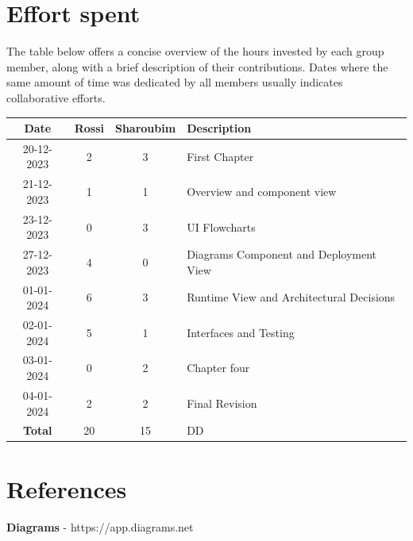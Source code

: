 \documentclass[12pt, a4paper]{report}
\begin{document}
\chapter{Effort spent}
    The table below offers a concise overview of the hours invested by each group member, along with a brief description of their contributions. 
    Dates where the same amount of time was dedicated by all members usually indicates collaborative efforts.
    \begin{table}[H]
        \centering
        \begin{tabular}{cccl}
            \textbf{Date}   & \textbf{Rossi}            & \textbf{Sharoubim}            & \textbf{Description}                          \\ \hline
            20-12-2023      & 2                         & 3                             & First Chapter                                 \\ 
            21-12-2023      & 1                         & 1                             & Overview and component view                   \\ 
            23-12-2023      & 0                         & 3                             & UI Flowcharts                                 \\ 
            27-12-2023      & 4                         & 0                             & Diagrams Component and Deployment View        \\ 
            01-01-2024      & 6                         & 3                             & Runtime View and Architectural Decisions      \\ 
            02-01-2024      & 5                         & 1                             & Interfaces and Testing                        \\ 
            03-01-2024      & 0                         & 2                             & Chapter four                                  \\ 
            04-01-2024      & 2                         & 2                             & Final Revision                                \\ \hline
            \textbf{Total}  & 20                        & 15                            & DD                                            \\  
        \end{tabular}
    \end{table}

\chapter{References}
    \textbf{Diagrams} - https://app.diagrams.net 
\end{document}

